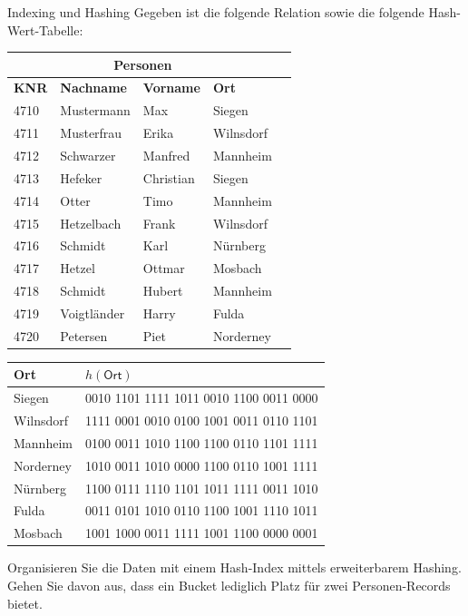 \begin{frame}[t]
\frametitle{\insertsection}
\begin{alertblock}{Indexing und Hashing}
Gegeben ist die folgende Relation sowie die folgende Hash-Wert-Tabelle:
\abs
{\scriptsize{
\begin{tabular}{|l|l|l|l|l|}\hline
\multicolumn{4
}{|c|}{\textbf{Personen}}\\\hline
\textbf{KNR} &\textbf{Nachname} & \textbf{Vorname}  & \textbf{Ort} \\\hline\hline
4710 &Mustermann &Max  &Siegen \\
4711 &Musterfrau &Erika  &Wilnsdorf \\
4712 &Schwarzer &Manfred  &Mannheim \\
4713 &Hefeker &Christian  &Siegen \\
4714 &Otter &Timo &Mannheim \\
4715 &Hetzelbach &Frank  &Wilnsdorf \\
4716 &Schmidt &Karl  &Nürnberg \\
4717 &Hetzel &Ottmar  &Mosbach \\
4718 &Schmidt & Hubert  &Mannheim \\
4719 &Voigtländer &Harry  &Fulda \\
4720 &Petersen &Piet &Norderney \\\hline
\end{tabular}
\hfill
\begin{tabular}{|l|l|}\hline
\textbf{Ort} & $h(\mathsf{Ort})$ \\\hline\hline
Siegen & 0010 1101 1111 1011 0010 1100 0011 0000\\
Wilnsdorf & 1111 0001 0010 0100 1001 0011 0110 1101\\
Mannheim & 0100 0011 1010 1100 1100 0110 1101 1111\\
Norderney & 1010 0011 1010 0000 1100 0110 1001 1111\\
Nürnberg & 1100 0111 1110 1101 1011 1111 0011 1010\\
Fulda & 0011 0101 1010 0110 1100 1001 1110 1011\\
Mosbach & 1001 1000 0011 1111 1001 1100 0000 0001\\\hline
\end{tabular}
}}
\abs
Organisieren Sie die Daten mit einem Hash-Index mittels erweiterbarem Hashing. 
\nl
Gehen Sie davon aus, dass ein Bucket lediglich Platz für zwei Personen-Records bietet.
\end{alertblock}
\end{frame}
